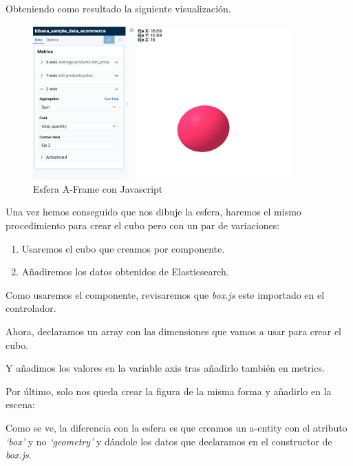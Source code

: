 \documentclass[a4paper, 12pt]{book}
\begin{document}


Obteniendo como resultado la siguiente visualización.

\begin{figure}[H]
  \centering
  \includegraphics[width=10cm, keepaspectratio]{img/development/only_sphere.png}
  \caption{Esfera A-Frame con Javascript}
  \label{fig:onlysphere}
\end{figure}

Una vez hemos conseguido que nos dibuje la esfera, haremos el mismo procedimiento para crear el cubo pero con un par de variaciones:

\begin{enumerate}
    \item Usaremos el cubo que creamos por componente.
    \item Añadiremos los datos obtenidos de Elasticsearch.
\end{enumerate}

Como usaremos el componente, revisaremos que \textit{box.js} este importado en el controlador.

Ahora, declaramos un array con las dimensiones que vamos a usar para crear el cubo. 



Y añadimos los valores en la variable axis tras añadirlo también en metrics.



Por último, solo nos queda crear la figura de la misma forma y añadirlo en la escena:



Como se ve, la diferencia con la esfera es que creamos un a-entity con el atributo \textit{`box'} y no \textit{`geometry'} y dándole los datos que declaramos en el constructor de \textit{box.js}.
\end{document}
